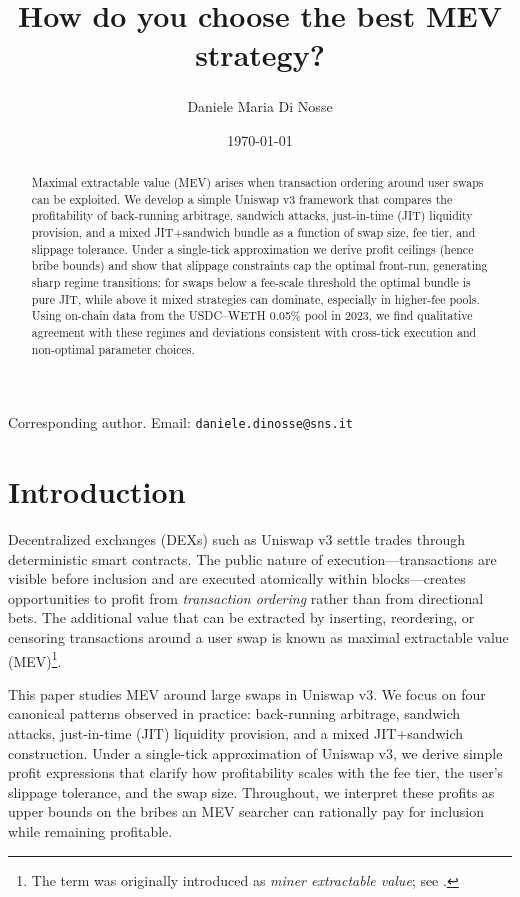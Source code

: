 \documentclass[a4paper,11pt]{article}
\title{How do you choose the best MEV strategy?}
\author[1]{Daniele Maria Di Nosse\textsuperscript{\dag}}
\affil[1]{Scuola Normale Superiore, Pisa, Italy}
\date{\today}
\begin{document}
\maketitle
\begin{center}
  \footnotesize
  \dag Corresponding author. Email: \texttt{daniele.dinosse@sns.it}
\end{center}
\begin{abstract}
Maximal extractable value (MEV) arises when transaction ordering around user swaps can be exploited. We develop a simple Uniswap v3 framework that compares the profitability of back-running arbitrage, sandwich attacks, just-in-time (JIT) liquidity provision, and a mixed JIT+sandwich bundle as a function of swap size, fee tier, and slippage tolerance. Under a single-tick approximation we derive profit ceilings (hence bribe bounds) and show that slippage constraints cap the optimal front-run, generating sharp regime transitions: for swaps below a fee-scale threshold the optimal bundle is pure JIT, while above it mixed strategies can dominate, especially in higher-fee pools. Using on-chain data from the USDC--WETH 0.05\% pool in 2023, we find qualitative agreement with these regimes and deviations consistent with cross-tick execution and non-optimal parameter choices.
\end{abstract}
\section{Introduction}
\label{sec:mev}

Decentralized exchanges (DEXs) such as Uniswap v3 \cite{adams2021} settle trades through deterministic smart contracts. The public nature of execution---transactions are visible before inclusion and are executed atomically within blocks---creates opportunities to profit from \emph{transaction ordering} rather than from directional bets. The additional value that can be extracted by inserting, reordering, or censoring transactions around a user swap is known as maximal extractable value (MEV)\footnote{The term was originally introduced as \emph{miner extractable value}; see \cite{flashboys}.}.

This paper studies MEV around large swaps in Uniswap v3. We focus on four canonical patterns observed in practice: back-running arbitrage, sandwich attacks, just-in-time (JIT) liquidity provision, and a mixed JIT+sandwich construction. Under a single-tick approximation of Uniswap v3, we derive simple profit expressions that clarify how profitability scales with the fee tier, the user’s slippage tolerance, and the swap size. Throughout, we interpret these profits as upper bounds on the bribes an MEV searcher can rationally pay for inclusion while remaining profitable.
\end{document}
